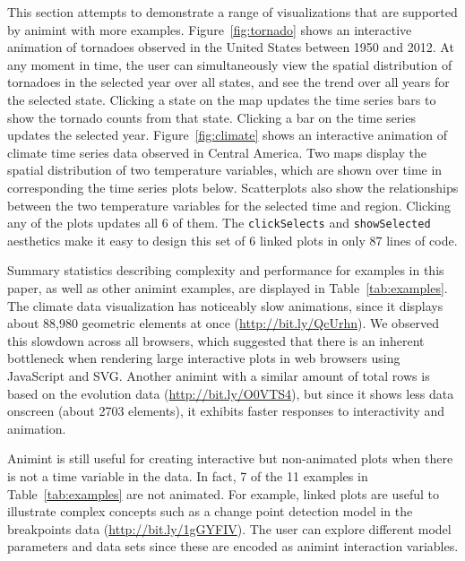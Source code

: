 \documentclass[journal]{vgtc}\usepackage[]{graphicx}\usepackage[]{color}
\begin{document}
This section attempts to demonstrate a range of visualizations that 
are supported by animint with more examples. 
Figure~\ref{fig:tornado} shows an interactive animation of tornadoes
observed in the United States between 1950 and 2012. At any moment in
time, the user can simultaneously view the spatial distribution of
tornadoes in the selected year over all states, and see the trend over
all years for the selected state. Clicking a state on the map updates the
time series bars to show the tornado counts from that state. Clicking
a bar on the time series updates the selected year. Figure~\ref{fig:climate} 
shows an interactive animation of climate
time series data observed in Central America. Two maps display the
spatial distribution of two temperature variables, which are shown
over time in corresponding the time series plots below. Scatterplots
also show the relationships between the two temperature variables for
the selected time and region. Clicking any of the plots updates all 6
of them. The \texttt{clickSelects} and \texttt{showSelected} aesthetics make it
easy to design this set of 6 linked plots in only 87 lines of code.

Summary statistics describing complexity and performance for 
examples in this paper, as well as other animint examples, 
are displayed in Table~\ref{tab:examples}. The climate data 
visualization has noticeably slow animations, 
since it displays about 88,980 geometric elements at once 
(\url{http://bit.ly/QcUrhn}). We observed
this slowdown across all browsers, which suggested that there is an
inherent bottleneck when rendering large interactive plots in web
browsers using JavaScript and SVG. Another animint with a similar
amount of total rows is based on the evolution data
(\url{http://bit.ly/O0VTS4}), but since it shows less data onscreen
(about 2703 elements), it exhibits faster responses to interactivity
and animation.

Animint is still useful for creating interactive but
non-animated plots when there is not a time variable in the data.
In fact, 7 of the 11 examples in
Table~\ref{tab:examples} are not animated. For example, linked plots
are useful to illustrate complex concepts such as a change point
detection model in the breakpoints data
(\url{http://bit.ly/1gGYFIV}). The user can explore different model
parameters and data sets since these are encoded as animint
interaction variables.
\end{document}
